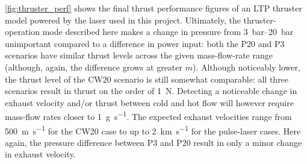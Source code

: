            \autoref{fig:thruster_perf} shows the final thrust performance figures of an LTP thruster model powered by the laser used in this project. Ultimately, the thruster-operation mode described here makes a change in pressure from \qtyrange{3}{20}{bar} unimportant compared to a difference in power input: both the P20 and P3 scenarios have similar thrust levels across the given mass-flow-rate range (although, again, the difference grows at greater $\dot{m}$). Although noticeably lower, the thrust level of the CW20 scenario is still somewhat comparable: all three scenarios result in thrust on the order of \qty{1}{N}. Detecting a noticeable change in exhaust velocity and/or thrust between cold and hot flow will however require mass-flow rates closer to \qty{1}{g.s^{-1}}. The expected exhaust velocities range from \qty{500}{m.s^{-1}} for the CW20 case to up to \qty{2}{km.s^{-1}} for the pulse-laser cases. Here again, the pressure difference between P3 and P20 result in only a minor change in exhaust velocity.

